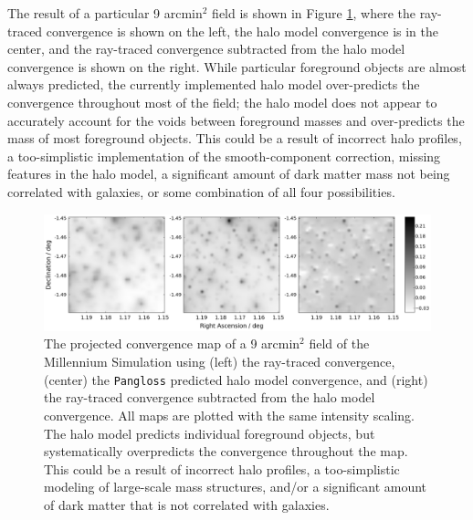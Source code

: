 \documentclass[%
 reprint,
 amsmath,amssymb,
 aps,nofootinbib
]{revtex4-1}
\begin{document}
The result of a particular 9 arcmin$^2$ field is shown in Figure \ref{fig:kappamaps}, where the ray-traced convergence is shown on the left, the halo model convergence is in the center, and the ray-traced convergence subtracted from the halo model convergence is shown on the right. While particular foreground objects are almost always predicted, the currently implemented halo model over-predicts the convergence throughout most of the field; the halo model does not appear to accurately account for the voids between foreground masses and over-predicts the mass of most foreground objects. This could be a result of incorrect halo profiles, a too-simplistic implementation of the smooth-component correction, missing features in the halo model, a significant amount of dark matter mass not being correlated with galaxies, or some combination of all four possibilities.

\begin{figure}
    \centering
    \includegraphics[width=\textwidth]{figs-swe/thesis/kappamaps.png}
    \captionsetup{justification=raggedright,singlelinecheck=false}
    \caption{The projected convergence map of a 9 arcmin$^2$ field of the Millennium Simulation using (left) the ray-traced convergence, (center) the \texttt{Pangloss} predicted halo model convergence, and (right) the ray-traced convergence subtracted from the halo model convergence. All maps are plotted with the same intensity scaling. The halo model predicts individual foreground objects, but systematically overpredicts the convergence throughout the map. This could be a result of incorrect halo profiles, a too-simplistic modeling of large-scale mass structures, and/or a significant amount of dark matter that is not correlated with galaxies.}
    \label{fig:kappamaps}
\end{figure}
%
\end{document}

